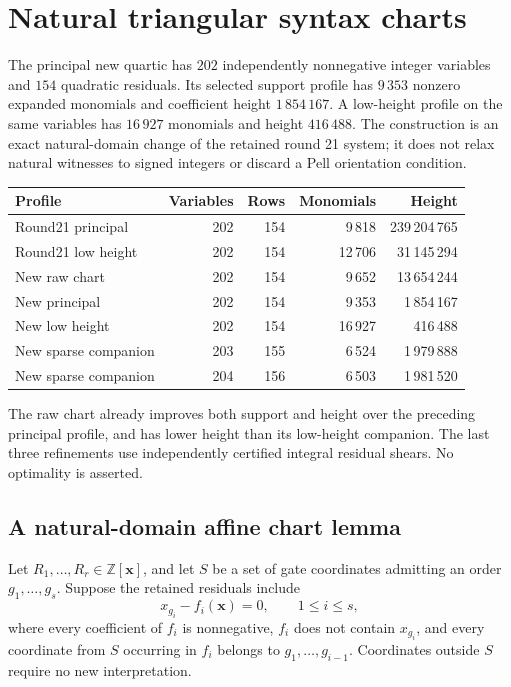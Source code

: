 \section{Natural triangular syntax charts}
\label{sec:natural-triangular-charts}

The principal new quartic has $202$ independently nonnegative integer
variables and $154$ quadratic residuals.  Its selected support profile has
$9\,353$ nonzero expanded monomials and coefficient height $1\,854\,167$.
A low-height profile on the same variables has $16\,927$ monomials and
height $416\,488$.  The construction is an exact natural-domain change of
the retained round 21 system; it does not relax natural witnesses to signed
integers or discard a Pell orientation condition.

\begin{center}
\begin{tabular}{lrrrr}
Profile & Variables & Rows & Monomials & Height\\
\hline
Round21 principal &202&154&9\,818&239\,204\,765\\
Round21 low height &202&154&12\,706&31\,145\,294\\
New raw chart &202&154&9\,652&13\,654\,244\\
New principal &202&154&9\,353&1\,854\,167\\
New low height &202&154&16\,927&416\,488\\
New sparse companion &203&155&6\,524&1\,979\,888\\
New sparse companion &204&156&6\,503&1\,981\,520
\end{tabular}
\end{center}

The raw chart already improves both support and height over the preceding
principal profile, and has lower height than its low-height companion.
The last three refinements use independently certified integral residual
shears.  No optimality is asserted.

\subsection{A natural-domain affine chart lemma}

Let $R_1,\ldots,R_r\in\mathbb Z[\boldsymbol x]$, and let $S$ be a set
of gate coordinates admitting an order $g_1,\ldots,g_s$.  Suppose the
retained residuals include
\begin{equation}
 x_{g_i}-f_i(\boldsymbol x)=0,\qquad 1\leq i\leq s,
 \label{eq:triangular-gate-definitions}
\end{equation}
where every coefficient of $f_i$ is nonnegative, $f_i$ does not contain
$x_{g_i}$, and every coordinate from $S$ occurring in $f_i$ belongs to
$g_1,\ldots,g_{i-1}$.  Coordinates outside $S$ require no new interpretation.

